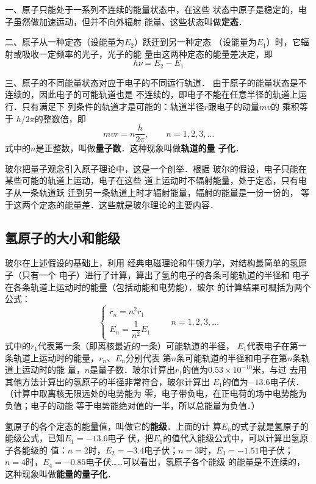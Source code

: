 一、原子只能处于一系列不连续的能量状态中，在这些
状态中原子是稳定的，电子虽然做加速运动，但并不向外辐射
能量、这些状态叫做\textbf{定态}．

二、原子从一种定态（设能量为$E_2$）跃迁到另一种定态
（设能量为$E_1$）时，它辐射或吸收一定频率的光子，光子的能
量由这两种定态的能量差决定，即
\[h\nu=E_2-E_1\]

三、原子的不同能量状态对应于电子的不同运行轨道．
由于原子的能量状态是不连续的，因此电子的可能轨道也是
不连续的，即电子不能在任意半径的轨道上运行．只有满足下
列条件的轨道才是可能的：轨道半径$r$跟电子的动量$mv$的
乘积等于 $h/2\pi$的整数倍，即
\[mvr=n\frac{h}{2\pi},\qquad n=1,2,3,\ldots\]
式中的$n$是正整数，叫做\textbf{量子数}．这种现象叫做\textbf{轨道的量
子化}．

玻尔把量子观念引入原子理论中，这是一个创举．根据
玻尔的假设，电子只能在某些可能的轨道上运动，电子在这些
道上运动时不辐射能量，处于定态，只有电子从一条轨道跃
迁到另一条轨道上时才辐射能量，辐射的能量是一份一份的，
等于这两个定态的能量差．这些就是玻尔理论的主要内容．

\subsection{氢原子的大小和能级}

玻尔在上述假设的基础上，利用
经典电磁理论和牛顿力学，对结构最简单的氢原子（只有一个
电子）进行了计算，算出了氢的电子的各条可能轨道的半径和
电子在各条轨道上运动时的能量（包括动能和电势能）．玻尔
的计算结果可概括为两个公式：
\[\begin{cases}
    r_n=n^2 r_1\\
    E_n=\dfrac{1}{n^2}E_1
\end{cases}\qquad n=1,2,3,\ldots\]
式中的$r_1$代表第一条（即离核最近的一条）可能轨道的半径，
$E_1$代表电子在第一条轨道上运动时的能量，$r_n$、$E_n$分别代表
第$n$条可能轨道的半径和电子在第$n$条轨道上运动时的能
量，$n$是量子数．玻尔计算出$r_1$的值为$0.53\times10^{-10}$米，与过
去用其他方法计算出的氢原子的半径非常符合，玻尔计算出
$E_1$的值为$-13.6$电子伏．（计算中取离核无限远处的电势能为
零，电子带负电，在正电荷的场中电势能为负值；电子的动能
等于电势能绝对值的一半，所以总能量为负值．）

氢原子的各个定态的能量值，叫做它的\textbf{能级}．上面的计
算$E_n$的式子就是氢原子的能级公式，已知$E_1=-13.6$电子
伏，把$E_1$的值代入能级公式中，可以计算出氢原子各能级的
值：$n=2$时，$E_2=-3.4$电子伏；$n=3$时，$E_3=-1.51$电子伏；
$n=4$时，$E_4=-0.85$电子伏……可以看出，氢原子各个能级
的能量是不连续的，这种现象叫做\textbf{能量的量子化}．

